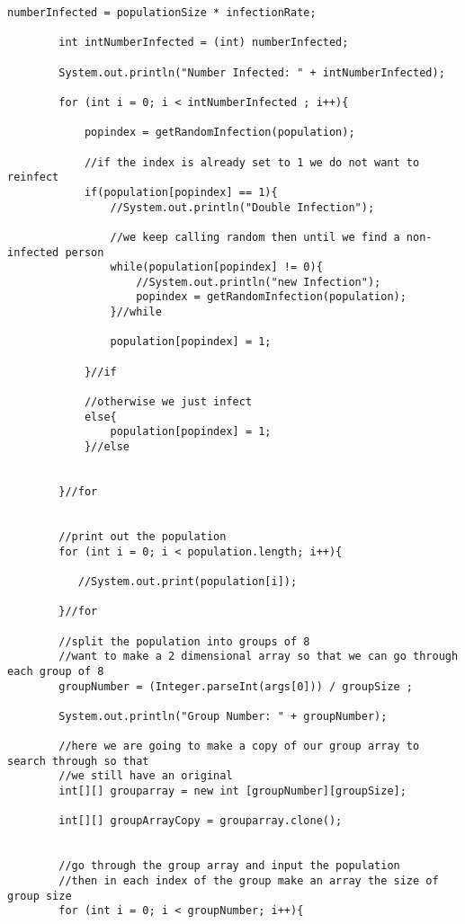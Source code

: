 \documentclass[letterpaper, 10pt,DIV=13]{scrartcl}
\numberwithin{equation}{section} %
\numberwithin{figure}{section} %
\numberwithin{table}{section} %
\begin{document}
\begin{lstlisting}[frame=single, ]
        numberInfected = populationSize * infectionRate;

        int intNumberInfected = (int) numberInfected;
        
        System.out.println("Number Infected: " + intNumberInfected);

        for (int i = 0; i < intNumberInfected ; i++){

            popindex = getRandomInfection(population);

            //if the index is already set to 1 we do not want to reinfect
            if(population[popindex] == 1){
                //System.out.println("Double Infection");
                
                //we keep calling random then until we find a non-infected person
                while(population[popindex] != 0){
                    //System.out.println("new Infection");
                    popindex = getRandomInfection(population);
                }//while

                population[popindex] = 1;

            }//if

            //otherwise we just infect
            else{
                population[popindex] = 1;
            }//else
            

        }//for
        

        //print out the population
        for (int i = 0; i < population.length; i++){

           //System.out.print(population[i]);
            
        }//for

        //split the population into groups of 8
        //want to make a 2 dimensional array so that we can go through each group of 8
        groupNumber = (Integer.parseInt(args[0])) / groupSize ;

        System.out.println("Group Number: " + groupNumber);
    
        //here we are going to make a copy of our group array to search through so that 
        //we still have an original 
        int[][] grouparray = new int [groupNumber][groupSize];

        int[][] groupArrayCopy = grouparray.clone();

       
        //go through the group array and input the population
        //then in each index of the group make an array the size of group size
        for (int i = 0; i < groupNumber; i++){


\end{lstlisting}
\end{document}
